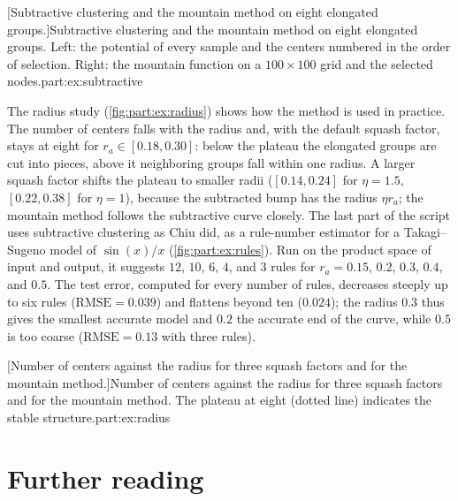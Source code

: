 [Subtractive clustering and the mountain method on eight elongated groups.]{Subtractive clustering and the mountain method on eight elongated groups. Left: the potential of every sample and the centers numbered in the order of selection. Right: the mountain function on a $100\times100$ grid and the selected nodes.}{part:ex:subtractive}

The radius study (\cref{fig:part:ex:radius}) shows how the method is used in practice. The number of centers falls with the radius and, with the default squash factor, stays at eight for $r_a\in[0.18,0.30]$: below the plateau the elongated groups are cut into pieces, above it neighboring groups fall within one radius. A larger squash factor shifts the plateau to smaller radii ($[0.14,0.24]$ for $\eta=1.5$, $[0.22,0.38]$ for $\eta=1$), because the subtracted bump has the radius $\eta r_a$; the mountain method follows the subtractive curve closely. The last part of the script uses subtractive clustering as Chiu did, as a rule-number estimator for a Takagi--Sugeno model of $\sin(x)/x$ (\cref{fig:part:ex:rules}). Run on the product space of input and output, it suggests $12$, $10$, $6$, $4$, and $3$ rules for $r_a=0.15$, $0.2$, $0.3$, $0.4$, and $0.5$. The test error, computed for every number of rules, decreases steeply up to six rules ($\mathrm{RMSE}=0.039$) and flattens beyond ten ($0.024$); the radius $0.3$ thus gives the smallest accurate model and $0.2$ the accurate end of the curve, while $0.5$ is too coarse ($\mathrm{RMSE}=0.13$ with three rules).

[Number of centers against the radius for three squash factors and for the mountain method.]{Number of centers against the radius for three squash factors and for the mountain method. The plateau at eight (dotted line) indicates the stable structure.}{part:ex:radius}

\section{Further reading}\label{sec:part:reading}

